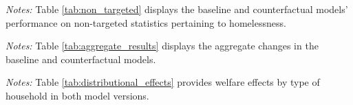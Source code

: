 \documentclass[parskip=full]{article}
\newenvironment{fignote2}[1]
{
\par
\medskip
\begin{minipage}{#1}
\footnotesize
}
{
\end{minipage}
}
\begin{document}
\begin{table}[H]
    \centering
    \caption{Non-targeted moments}
    \vspace{-1.25cm}
    \label{tab:non_targeted}
    
    \vspace{-0.65cm}
    \begin{fignote2}{1.1\textwidth}
    \hspace*{-0.5cm}
    \textit{Notes:} Table \ref{tab:non_targeted} displays the baseline and counterfactual models' performance on non-targeted statistics pertaining to homelessness.
    \end{fignote2}
\end{table}

\vspace{1cm}

\begin{table}[H]
    \centering
    \caption{Aggregate effects of housing voucher policy to eradicate homelessness}
    \vspace{-1.25cm}
    \label{tab:aggregate_results}
    
    \vspace{-0.65cm}
    \begin{fignote2}{0.66\textwidth}
    \textit{Notes:} Table \ref{tab:aggregate_results} displays the aggregate changes in the baseline and counterfactual models.
    \end{fignote2}
\end{table}

\begin{table}[H]
    \centering
    \caption{Distributional welfare effects in consumption terms expressed in percentages}
    \vspace{-1.25cm}
    \label{tab:distributional_effects}
    
    \vspace{-0.55cm}
    \begin{fignote2}{0.44\textwidth}
    \textit{Notes:} Table \ref{tab:distributional_effects} provides welfare effects by type of household in both model versions.
    \end{fignote2}
\end{table}
\end{document}
